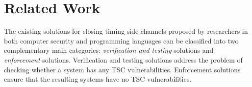 {%
\section{Related Work}
\label{sec:RelatedWork}

The existing solutions for closing timing side-channels proposed by researchers in both computer security and programming languages can be classified into two complementary main categories: \emph{verification and testing} solutions and \emph{enforcement} solutions. {Verification and testing} solutions address the problem of checking whether a system has any TSC vulnerabilities. {Enforcement} solutions ensure that the resulting systems have no TSC vulnerabilities. %

}
